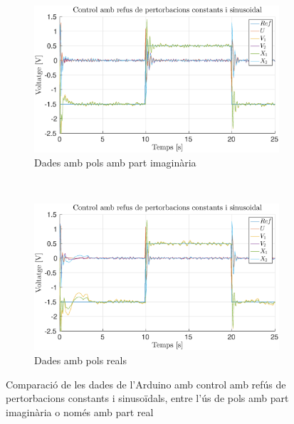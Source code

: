\documentclass[12pt,a4paper,final,twoside,openright]{report}
\begin{document}
\begin{figure}[h]
\centering
	\begin{subfigure}[r]{0.8\textwidth}
		\includegraphics[width=\textwidth]{Imatges/pert_sin_ct_pols_imag.eps}
		\caption{Dades amb pols amb part imaginària}
	\end{subfigure}\\
	\vspace{15pt}
	\begin{subfigure}[r]{0.8\textwidth}
		\includegraphics[width=\textwidth]{Imatges/pert_sin_ct_pols_real.eps}
		\caption{Dades amb pols reals}
	\end{subfigure}
\caption{Comparació de les dades de l'Arduino amb control amb refús de pertorbacions constants i sinusoïdals, entre l'ús de pols amb part imaginària o només amb part real\label{fig:pert_real_imag_sin_ct}}
\end{figure}

%
\end{document}
